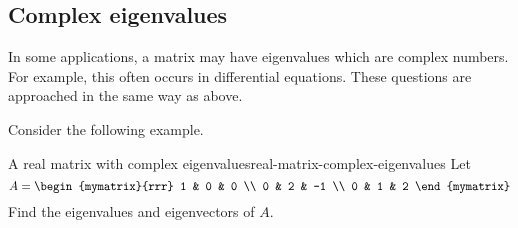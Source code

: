 \subsection{Complex eigenvalues}

In some applications, a matrix may have eigenvalues
 which are complex numbers. For example, this often occurs in
differential equations. These questions are approached in the same way as above.

Consider the following example.

\begin{example}{A real matrix with complex eigenvalues}{real-matrix-complex-eigenvalues}
Let 
\begin{equation*}
A=\begin{mymatrix}{rrr}
1 & 0 &  0 \\
0 & 2 & -1 \\
0 & 1 &  2
\end{mymatrix} 
\end{equation*}
Find the eigenvalues and eigenvectors of $A$.
\end{example}

